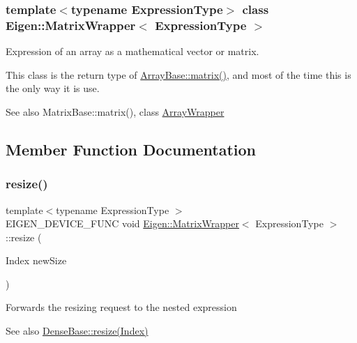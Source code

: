 \subsubsection*{template$<$typename Expression\+Type$>$\newline
class Eigen\+::\+Matrix\+Wrapper$<$ Expression\+Type $>$}

Expression of an array as a mathematical vector or matrix. 

This class is the return type of \mbox{\hyperlink{class_eigen_1_1_array_base_ac513167ec762bbf639dc375d314d91d3}{Array\+Base\+::matrix()}}, and most of the time this is the only way it is use.

\begin{DoxySeeAlso}{See also}
Matrix\+Base\+::matrix(), class \mbox{\hyperlink{class_eigen_1_1_array_wrapper}{Array\+Wrapper}} 
\end{DoxySeeAlso}


\subsection{Member Function Documentation}
\mbox{\label{class_eigen_1_1_matrix_wrapper_a0244fd1071715e2b0cd60e39c1e6e56a}} 
\subsubsection{\texorpdfstring{resize()}{resize()}\hspace{0.1cm}{\footnotesize\ttfamily [1/2]}}
{\footnotesize\ttfamily template$<$typename Expression\+Type $>$ \\
E\+I\+G\+E\+N\+\_\+\+D\+E\+V\+I\+C\+E\+\_\+\+F\+U\+NC void \mbox{\hyperlink{class_eigen_1_1_matrix_wrapper}{Eigen\+::\+Matrix\+Wrapper}}$<$ Expression\+Type $>$\+::resize (\begin{DoxyParamCaption}\item[{Index}]{new\+Size }\end{DoxyParamCaption})\hspace{0.3cm}{\ttfamily [inline]}}

Forwards the resizing request to the nested expression \begin{DoxySeeAlso}{See also}
\mbox{\hyperlink{class_eigen_1_1_dense_base_a13027a493a68a13496610caf3d81bd3e}{Dense\+Base\+::resize(\+Index)}} 
\end{DoxySeeAlso}
\mbox{\label{class_eigen_1_1_matrix_wrapper_a6b0c3c352ad14c57294b022237b7489f}} 
